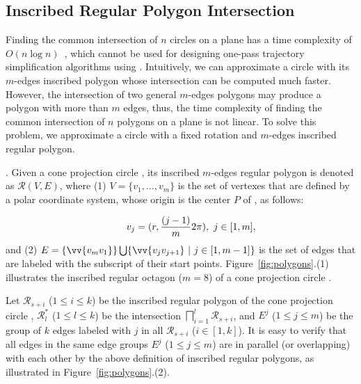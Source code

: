 \subsection{Inscribed Regular Polygon Intersection}
\label{subsec-RPI}

Finding the common intersection of $n$ circles on a plane has a time complexity of ${O(n\log n)}$~\cite{Shamos:Circle}, which cannot be used for designing one-pass trajectory simplification algorithms using \sed.
%
Intuitively, we can approximate a circle with its $m$-edges inscribed polygon {whose intersection can be computed much faster}. However, the intersection of two general $m$-edges polygons may produce a polygon with more than $m$ edges, thus, the time complexity of finding the common intersection of $n$ polygons on a plane is not linear. To solve this problem, we approximate a circle with a fixed rotation and $m$-edges inscribed regular polygon.

.
Given a cone projection circle , its inscribed $m$-edges regular polygon is denoted as $\mathcal{R}(V, E)$,
where (1) $V=\{v_1, \ldots, v_{m}\}$ is the set of vertexes that are defined by a polar coordinate system, whose origin is the center $P$ of \pcircle{}, as follows:


\vspace{-2ex}
\begin{equation*}
\label{equ-regular-polygon}
    \begin{aligned}
        \hspace{5ex}  v_j = (r, \frac{(j-1)}{m}2\pi), ~j \in [1, m], \\
    \end{aligned}
\end{equation*}
%
\ni and (2) $E= \{\vv{v_mv_1}\} \bigcup \{\vv{v_jv_{j+1}}\ |\ j\in [1, m-1]\}$ is the set of edges that are labeled with the subscript of their start points.
%
Figure~\ref{fig:polygons}.(1) illustrates the inscribed regular octagon ($m=8$) of a cone projection circle .

Let $\mathcal{R}_{s+i}$ ($1\le i \le k$) be the inscribed regular polygon of the cone projection  circle ,
$\mathcal{R}^*_l$ ($1\le l\le k$) be the intersection $\bigsqcap_{i=1}^{l}\mathcal{R}_{s+i}$,
and $E^j$ ($1\le j \le m$) be the group of $k$ edges labeled with $j$ in all $\mathcal{R}_{s+i}$ ($i\in[1, k]$).
%
It is easy to verify that all edges in the same edge groups $E^j$ ($1\le j\le m$) are in parallel (or overlapping) with each other by the above definition of inscribed regular polygons, as illustrated in Figure~\ref{fig:polygons}.(2).



